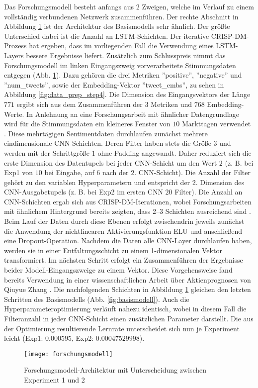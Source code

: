 Das Forschungsmodell besteht anfangs aus $2$ Zweigen, welche im Verlauf zu einem vollständig verbundenen Netzwerk zusammenführen. Der rechte Abschnitt in Abbildung \ref{fig:forschungsmodell} ist der Architektur des Basismodells sehr ähnlich. Der größte Unterschied dabei ist die Anzahl an \ac{LSTM}-Schichten. Der iterative \ac{CRISP-DM}-Prozess hat ergeben, dass im vorliegenden Fall die Verwendung eines \ac{LSTM}-Layers bessere Ergebnisse liefert.
Zusätzlich zum Schlusspreis nimmt das Forschungsmodell im linken Eingangszweig vorverarbeitete Stimmungsdaten entgegen (Abb. \ref{fig:forschungsmodell}). Dazu gehören die drei Metriken ''positive'', ''negative'' und ''num\_tweets'', sowie der Embedding-Vektor ''tweet\_embs'', zu sehen in Abbildung \ref{fig:data_prep_step4}. Die Dimension des Eingangsvektors der Länge $771$ ergibt sich aus dem Zusammenführen der $3$ Metriken und $768$ Embedding-Werte. In Anlehnung an eine Forschungsarbeit mit ähnlicher Datengrundlage wird für die Stimmungsdaten ein kleineres Fenster von $10$ Markttagen verwendet \autocite[Kap. 4.1]{zhang2022transformer}.
Diese mehrtägigen Sentimentdaten durchlaufen zunächst mehrere eindimensionale \ac{CNN}-Schichten. Deren Filter haben stets die Größe $3$ und werden mit der Schrittgröße $1$ ohne Padding angewandt. Daher reduziert sich die erste Dimension des Datentupels bei jeder \ac{CNN}-Schicht um den Wert $2$ (z. B. bei Exp1 von $10$ bei Eingabe, auf $6$ nach der 2. \ac{CNN}-Schicht). Die Anzahl der Filter gehört zu den variablen Hyperparametern und entspricht der 2. Dimension des \ac{CNN}-Ausgabetupels (z. B. bei Exp2 im ersten CNN $20$ Filter).
Die Anzahl an \ac{CNN}-Schichten ergab sich aus \ac{CRISP-DM}-Iterationen, wobei Forschungsarbeiten mit ähnlichem Hintergrund bereits zeigten, dass 2–3 Schichten ausreichend sind \autocite[Kap. 8.2]{guan2020stockprice}. Beim Lauf der Daten durch diese Ebenen erfolgt zwischendrin jeweils zunächst die Anwendung der nichtlinearen Aktivierungsfunktion \ac{ELU} und anschließend eine Dropout-Operation.
Nachdem die Daten alle \ac{CNN}-Layer durchlaufen haben, werden sie in einer Entfaltungsschicht zu einem 1-dimensionalen Vektor transformiert.
Im nächsten Schritt erfolgt ein Zusammenführen der Ergebnisse beider Modell-Eingangszweige zu einem Vektor. Diese Vorgehensweise fand bereits Verwendung in einer wissenschaftlichen Arbeit über Aktienprognosen von Qiuyue Zhang \autocite[Kap. 4.2.1]{zhang2022transformer}.
Die nachfolgenden Schichten in Abbildung \ref{fig:forschungsmodell} gleichen den letzten Schritten des Basismodells (Abb. \ref{fig:basismodell}). Auch die Hyperparameteroptimierung verläuft nahezu identisch, wobei in diesem Fall die Filteranzahl in jeder CNN-Schicht einen zusätzlichen Parameter darstellt.
Die aus der Optimierung resultierende Lernrate unterscheidet sich nun je Experiment leicht (Exp1: $0.000595$, Exp2: $0.00047529998$).
\begin{figure}[H]
	\texttt{[image: forschungsmodell]}
	\caption{Forschungsmodell-Architektur mit Unterscheidung zwischen Experiment 1 und 2}
	\label{fig:forschungsmodell}
\end{figure}









